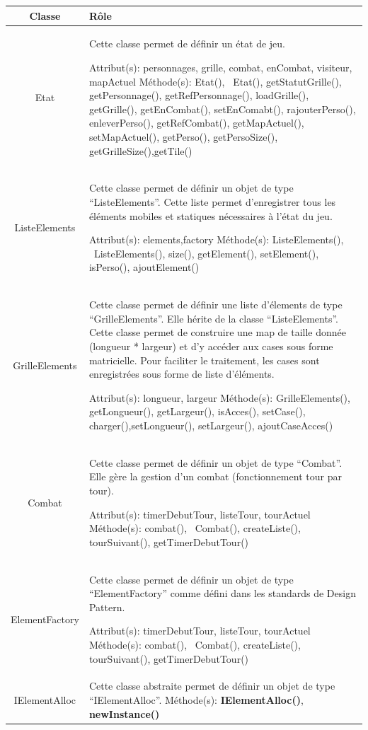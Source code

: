 \documentclass[11pt, a4paper]{article}
\begin{document}
\begin{tabularx}{\textwidth}{ |c|X| }
\hline
	\textbf{Classe} & \textbf{Rôle} \\
\hline

   Etat & Cette classe permet de définir un état de jeu.

Attribut(s): personnages, grille, combat, enCombat, visiteur, mapActuel\newline
Méthode(s): Etat(), ~Etat(), getStatutGrille(), getPersonnage(), getRefPersonnage(), loadGrille(), getGrille(), getEnCombat(), setEnComabt(), rajouterPerso(), enleverPerso(), getRefCombat(), getMapActuel(), setMapActuel(), getPerso(), getPersoSize(), getGrilleSize(),getTile()
 \\
\hline

   ListeElements & Cette classe permet de définir un objet de type “ListeElements”. Cette liste permet d’enregistrer tous les éléments mobiles et statiques nécessaires à l’état du jeu.

Attribut(s): elements,factory
\newline
Méthode(s): ListeElements(), ~ListeElements(), size(), getElement(), setElement(), isPerso(), ajoutElement()
 \\
\hline

   GrilleElements & Cette classe permet de définir une liste d’élements de type “GrilleElements”. Elle hérite de la classe “ListeElements”. Cette classe permet de construire une map de taille donnée (longueur * largeur) et d’y accéder aux cases sous forme matricielle. Pour faciliter le traitement, les cases sont enregistrées sous forme de liste d’éléments.

Attribut(s): longueur, largeur
\newline
Méthode(s): GrilleElements(), getLongueur(), getLargeur(), isAcces(), setCase(), charger(),setLongueur(), setLargeur(), ajoutCaseAcces()
 \\
\hline

   Combat & Cette classe permet de définir un objet de type “Combat”. Elle gère la gestion d’un combat (fonctionnement tour par tour).

Attribut(s): timerDebutTour, listeTour, tourActuel
\newline
Méthode(s): combat(), ~Combat(), createListe(), tourSuivant(), getTimerDebutTour()
 \\
\hline

   ElementFactory & Cette classe permet de définir un objet de type “ElementFactory” comme défini dans les standards de Design Pattern.

Attribut(s): timerDebutTour, listeTour, tourActuel
\newline
Méthode(s): combat(), ~Combat(), createListe(), tourSuivant(), getTimerDebutTour()
 \\
\hline

   IElementAlloc & Cette classe abstraite permet de définir un objet de type “IElementAlloc”.
\newline
Méthode(s): \textbf{IElementAlloc()}, \textbf{newInstance()}
 \\*
\hline

\end{tabularx} 
\end{document}

